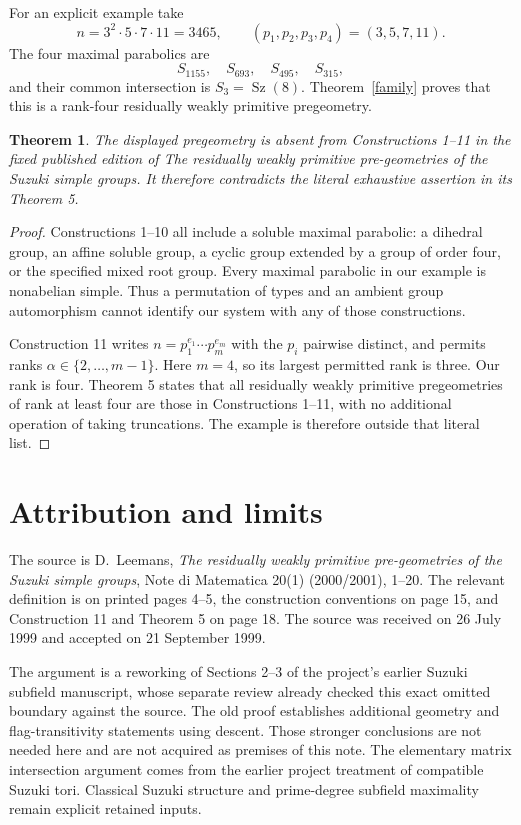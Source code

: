 \documentclass[11pt,a4paper]{article}
\newtheorem{theorem}{Theorem}
\newcommand{\Sz}{\operatorname{Sz}}
\begin{document}
For an explicit example take
\[
       n=3^2\cdot5\cdot7\cdot11=3465,
       \qquad (p_1,p_2,p_3,p_4)=(3,5,7,11).
\]
The four maximal parabolics are
\[
                 S_{1155},\quad S_{693},\quad S_{495},\quad S_{315},
\]
and their common intersection is $S_3=\Sz(8)$.
Theorem~\ref{family} proves that this is a rank-four residually weakly
primitive pregeometry.

\begin{theorem}\label{omission}
The displayed pregeometry is absent from Constructions 1--11 in the
fixed published edition of \emph{The residually weakly primitive
pre-geometries of the Suzuki simple groups}. It therefore contradicts
the literal exhaustive assertion in its Theorem 5.
\end{theorem}
\begin{proof}
Constructions 1--10 all include a soluble maximal parabolic: a dihedral
group, an affine soluble group, a cyclic group extended by a group of
order four, or the specified mixed root group. Every maximal parabolic
in our example is nonabelian simple. Thus a permutation of types and
an ambient group automorphism cannot identify our system with any of
those constructions.

Construction 11 writes $n=p_1^{e_1}\cdots p_m^{e_m}$ with the $p_i$
pairwise distinct, and permits ranks $\alpha\in\{2,\ldots,m-1\}$.
Here $m=4$, so its largest permitted rank is three. Our rank is four.
Theorem 5 states that all residually weakly primitive pregeometries of
rank at least four are those in Constructions 1--11, with no additional
operation of taking truncations. The example is therefore outside that
literal list.
\end{proof}

\section{Attribution and limits}
The source is D.~Leemans, \emph{The residually weakly primitive
pre-geometries of the Suzuki simple groups}, Note di Matematica 20(1)
(2000/2001), 1--20. The relevant definition is on printed pages 4--5,
the construction conventions on page 15, and Construction 11 and
Theorem 5 on page 18. The source was received on 26 July 1999 and
accepted on 21 September 1999.

The argument is a reworking of Sections 2--3 of the project's earlier
Suzuki subfield manuscript, whose separate review already checked this
exact omitted boundary against the source. The old proof establishes
additional geometry and flag-transitivity statements using descent.
Those stronger conclusions are not needed here and are not acquired
as premises of this note. The elementary matrix intersection argument
comes from the earlier project treatment of compatible Suzuki tori.
Classical Suzuki structure and prime-degree subfield maximality remain
explicit retained inputs.
\end{document}
